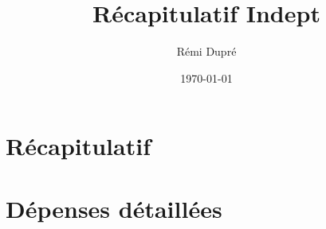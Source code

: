 \documentclass{article}
\title{Récapitulatif Indept}
\author{Rémi Dupré}
\date\today
\begin{document}
    \maketitle
    
    \part*{Récapitulatif}
    
    \part*{Dépenses détaillées}
    
\end{document}
